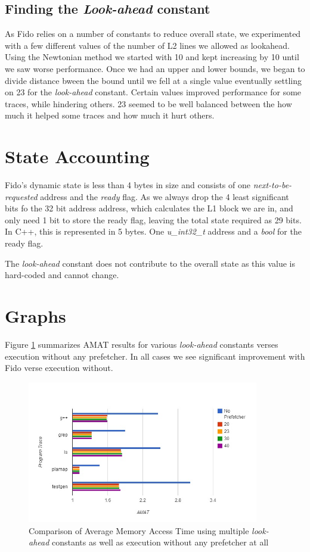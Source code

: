 \documentclass[11pt]{article}
\begin{document}
\subsection{Finding the \textit{Look-ahead} constant}
As Fido relies on a number of constants to reduce overall state, we experimented with a few different values of the number of L2 lines we allowed as lookahead. Using the Newtonian method we started with 10 and kept increasing by 10 until we saw worse performance. Once we had an upper and lower bounds, we began to divide distance bween the bound until we fell at a single value eventually settling on 23 for the \textit{look-ahead} constant. Certain values improved performance for some traces, while hindering others. 23 seemed to be well balanced between the how much it helped some traces and how much it hurt others.  

\section{State Accounting}
Fido's dynamic state is less than 4 bytes in size and consists of one \textit{next-to-be-requested} address and the \textit{ready} flag. As we always drop the 4 least significant bits fo the 32 bit address address, which calculates the L1 block we are in, and only need 1 bit to store the ready flag, leaving the total state required as 29 bits. In C++, this is represented in 5 bytes. One \textit{u\_int32\_t} address and a \textit{bool} for the ready flag. 

The \textit{look-ahead} constant does not contribute to the overall state as this value is hard-coded and cannot change. 

\section{Graphs}
Figure \ref{AMAT} summarizes AMAT results for various \textit{look-ahead} constants verses execution without any prefetcher. In all cases we see significant improvement with Fido verse execution without. 

\begin{figure}[H]

\centering
\includegraphics[width=0.9\textwidth]{AMAT.jpg}
\caption{ \label{AMAT} Comparison of Average Memory Access Time using multiple \textit{look-ahead} constants as well as execution without any prefetcher at all }
\end{figure}
\end{document}
